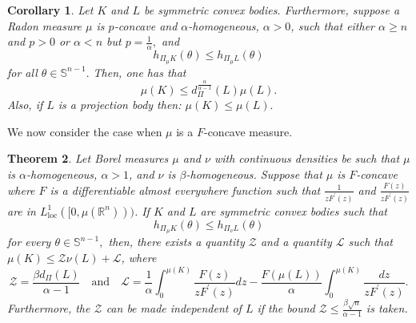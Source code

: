\documentclass[11pt]{amsart}
\newtheorem{theorem}{Theorem}[section]
\newtheorem{corollary}[theorem]{Corollary}
\theoremstyle{definition}
\theoremstyle{remark}
\numberwithin{equation}{section}
\newcommand{\R}{\mathbb{R}}
\newcommand{\s}{\mathbb{S}}
\begin{document}
\begin{corollary}
\label{cor:q_1}
Let $K$ and $L$ be symmetric convex bodies. Furthermore, suppose a Radon measure $\mu$ is $p$-concave and $\alpha$-homogeneous, $\alpha>0$, such that either $\alpha \geq n$ and $p>0$ or $\alpha<n$ but $p=\frac{1}{\alpha},$ and
$$h_{\Pi_\mu K}(\theta)\leq h_{\Pi_\mu L}(\theta)$$ for all $\theta\in\s^{n-1}.$ Then, one has that
$$\mu(K) \leq d^{\frac{\alpha}{\alpha-1}}_{\Pi}(L) \mu(L).$$
Also, if $L$ is a projection body then: $\mu(K) \leq \mu(L).$
\end{corollary}

We now consider the case when $\mu$ is a $F$-concave measure.
\begin{theorem}
\label{t:hard_1}
Let Borel measures $\mu$ and $\nu$ with continuous densities be such that $\mu$ is $\alpha$-homogeneous, $\alpha >1$, and $\nu$ is $\beta$-homogeneous. Suppose that $\mu$ is $F$-concave where $F$ is a differentiable almost everywhere function such that $\frac{1}{zF^\prime(z)}$ and $\frac{F(z)}{zF^\prime(z)}$ are in $L^1_{\text{loc}}([0,\mu(\R^n)))$. If $K$ and $L$ are symmetric convex bodies such that $$h_{\Pi_{\mu} K}(\theta) \le h_{\Pi_{\nu} L}(\theta)$$ for every $\theta\in\s^{n-1},$ then, there exists a quantity $\mathcal{Z}$ and a quantity $\mathcal{L}$ such that 
$\mu(K) \le \mathcal{Z} \nu(L) +\mathcal{L}$, where
\begin{equation}
\mathcal{Z}=\frac{\beta d_{\Pi}(L)}{\alpha-1} \quad \text{and} \quad \mathcal{L}= \frac{1}{\alpha}\int_{0}^{\mu(K)} \frac{F(z)}{zF^\prime(z)}dz -  \frac{F(\mu(L))}{\alpha} \int_{0}^{\mu(K)}\frac{dz}{zF^\prime(z)}.
\label{eq:Z}
\end{equation}
Furthermore, the $\mathcal{Z}$ can be made independent of $L$ if the bound $\mathcal{Z}\leq \frac{\beta \sqrt{n}}{\alpha-1}$ is taken.
\end{theorem}
\end{document}

